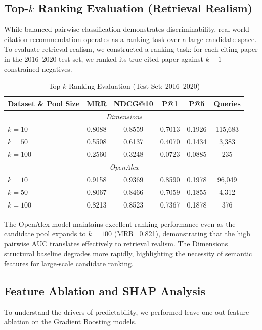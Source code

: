 \documentclass[11pt,a4paper]{article}
\begin{document}
\subsection{Top-$k$ Ranking Evaluation (Retrieval Realism)}
While balanced pairwise classification demonstrates discriminability, real-world citation recommendation operates as a ranking task over a large candidate space. To evaluate retrieval realism, we constructed a ranking task: for each citing paper in the 2016--2020 test set, we ranked its true cited paper against $k-1$ constrained negatives.

\begin{table}[H]
\centering
\caption{Top-$k$ Ranking Evaluation (Test Set: 2016--2020)}
\label{tab:ranking}
\begin{tabular}{lccccc}
\toprule
\textbf{Dataset \& Pool Size} & \textbf{MRR} & \textbf{NDCG@10} & \textbf{P@1} & \textbf{P@5} & \textbf{Queries} \\
\midrule
\multicolumn{6}{c}{\textit{Dimensions}} \\
$k=10$ & 0.8088 & 0.8559 & 0.7013 & 0.1926 & 115,683 \\
$k=50$ & 0.5508 & 0.6137 & 0.4070 & 0.1434 & 3,383 \\
$k=100$ & 0.2560 & 0.3248 & 0.0723 & 0.0885 & 235 \\
\midrule
\multicolumn{6}{c}{\textit{OpenAlex}} \\
$k=10$ & 0.9158 & 0.9369 & 0.8590 & 0.1978 & 96,049 \\
$k=50$ & 0.8067 & 0.8466 & 0.7059 & 0.1855 & 4,312 \\
$k=100$ & 0.8213 & 0.8523 & 0.7367 & 0.1878 & 376 \\
\bottomrule
\end{tabular}
\end{table}

The OpenAlex model maintains excellent ranking performance even as the candidate pool expands to $k=100$ (MRR=0.821), demonstrating that the high pairwise AUC translates effectively to retrieval realism. The Dimensions structural baseline degrades more rapidly, highlighting the necessity of semantic features for large-scale candidate ranking.

\subsection{Feature Ablation and SHAP Analysis}
To understand the drivers of predictability, we performed leave-one-out feature ablation on the Gradient Boosting models.
\end{document}
